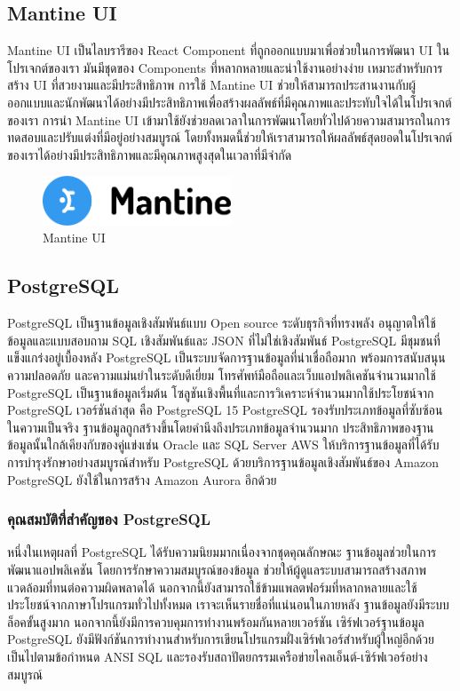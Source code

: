 \subsection{Mantine UI}
Mantine UI \cite{web:mantine} เป็นไลบรารีของ React Component ที่ถูกออกแบบมาเพื่อช่วยในการพัฒนา UI ในโปรเจกต์ของเรา มันมีชุดของ Components ที่หลากหลายและน่าใช้งานอย่างง่าย เหมาะสำหรับการสร้าง UI ที่สวยงามและมีประสิทธิภาพ การใช้ Mantine UI ช่วยให้สามารถประสานงานกับผู้ออกแบบและนักพัฒนาได้อย่างมีประสิทธิภาพเพื่อสร้างผลลัพธ์ที่มีคุณภาพและประทับใจได้ในโปรเจกต์ของเรา การนำ Mantine UI เข้ามาใช้ยังช่วยลดเวลาในการพัฒนาโดยทั่วไปด้วยความสามารถในการทดสอบและปรับแต่งที่มีอยู่อย่างสมบูรณ์ โดยทั้งหมดนี้ช่วยให้เราสามารถให้ผลลัพธ์สุดยอดในโปรเจกต์ของเราได้อย่างมีประสิทธิภาพและมีคุณภาพสูงสุดในเวลาที่มีจำกัด
\begin{figure}
    \centering
    \includegraphics[width=0.5\textwidth]{img/mantine.png}
    \caption{Mantine UI}
    \label{fig:mantine}
\end{figure}

\subsection{PostgreSQL}
PostgreSQL \cite{web:postgresql} เป็นฐานข้อมูลเชิงสัมพันธ์แบบ Open source ระดับธุรกิจที่ทรงพลัง อนุญาตให้ใช้ข้อมูลและแบบสอบถาม SQL เชิงสัมพันธ์และ JSON ที่ไม่ใช่เชิงสัมพันธ์ PostgreSQL มีชุมชนที่แข็งแกร่งอยู่เบื้องหลัง PostgreSQL เป็นระบบจัดการฐานข้อมูลที่น่าเชื่อถือมาก พร้อมการสนับสนุน ความปลอดภัย และความแม่นยำในระดับดีเยี่ยม โทรศัพท์มือถือและเว็บแอปพลิเคชันจำนวนมากใช้ PostgreSQL เป็นฐานข้อมูลเริ่มต้น โซลูชันเชิงพื้นที่และการวิเคราะห์จำนวนมากใช้ประโยชน์จาก PostgreSQL เวอร์ชันล่าสุด คือ PostgreSQL 15 PostgreSQL รองรับประเภทข้อมูลที่ซับซ้อน ในความเป็นจริง ฐานข้อมูลถูกสร้างขึ้นโดยคำนึงถึงประเภทข้อมูลจำนวนมาก ประสิทธิภาพของฐานข้อมูลนั้นใกล้เคียงกับของคู่แข่งเช่น Oracle และ SQL Server AWS ให้บริการฐานข้อมูลที่ได้รับการบำรุงรักษาอย่างสมบูรณ์สำหรับ PostgreSQL ด้วยบริการฐานข้อมูลเชิงสัมพันธ์ของ Amazon PostgreSQL ยังใช้ในการสร้าง Amazon Aurora อีกด้วย
\subsubsection{คุณสมบัติที่สำคัญของ PostgreSQL}
หนึ่งในเหตุผลที่ PostgreSQL ได้รับความนิยมมากเนื่องจากชุดคุณลักษณะ ฐานข้อมูลช่วยในการ พัฒนาแอปพลิเคชัน โดยการรักษาความสมบูรณ์ของข้อมูล ช่วยให้ผู้ดูแลระบบสามารถสร้างสภาพแวดล้อมที่ทนต่อความผิดพลาดได้ นอกจากนี้ยังสามารถใช้ข้ามแพลตฟอร์มที่หลากหลายและใช้ประโยชน์จากภาษาโปรแกรมทั่วไปทั้งหมด เราจะเห็นรายชื่อที่แน่นอนในภายหลัง
ฐานข้อมูลยังมีระบบล็อคขั้นสูงมาก นอกจากนี้ยังมีการควบคุมการทำงานพร้อมกันหลายเวอร์ชัน เซิร์ฟเวอร์ฐานข้อมูล PostgreSQL ยังมีฟังก์ชันการทำงานสำหรับการเขียนโปรแกรมฝั่งเซิร์ฟเวอร์สำหรับผู้ใหญ่อีกด้วย เป็นไปตามข้อกำหนด ANSI SQL และรองรับสถาปัตยกรรมเครือข่ายไคลเอ็นต์-เซิร์ฟเวอร์อย่างสมบูรณ์



